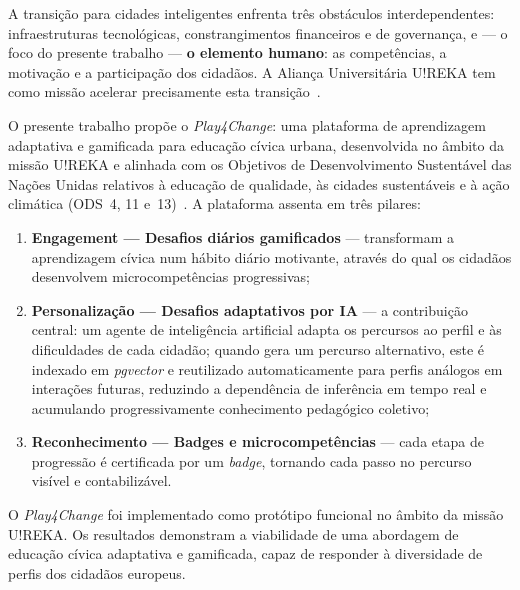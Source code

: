 \abstractPT  %

A transição para cidades inteligentes enfrenta três obstáculos interdependentes:
infraestruturas tecnológicas, constrangimentos financeiros e de governança, e --- o foco do
presente trabalho --- \textbf{o elemento humano}: as competências, a motivação e a
participação dos cidadãos. A Aliança Universitária U!REKA tem como missão acelerar
precisamente esta transição~\cite{ureka2024}.

O presente trabalho propõe o \textit{Play4Change}: uma plataforma de aprendizagem adaptativa
e gamificada para educação cívica urbana, desenvolvida no âmbito da missão U!REKA e alinhada
com os Objetivos de Desenvolvimento Sustentável das Nações Unidas relativos à educação de
qualidade, às cidades sustentáveis e à ação climática (ODS~4, 11 e~13)~\cite{un2015sdg}.
A plataforma assenta em três pilares:

\begin{enumerate}
  \item \textbf{Engagement --- Desafios diários gamificados} --- transformam a aprendizagem
        cívica num hábito diário motivante, através do qual os cidadãos desenvolvem
        microcompetências progressivas;

  \item \textbf{Personalização --- Desafios adaptativos por IA} --- a contribuição central:
        um agente de inteligência artificial adapta os percursos ao perfil e às dificuldades
        de cada cidadão; quando gera um percurso alternativo, este é indexado em
        \textit{pgvector} e reutilizado automaticamente para perfis análogos em interações
        futuras, reduzindo a dependência de inferência em tempo real e acumulando
        progressivamente conhecimento pedagógico coletivo;

  \item \textbf{Reconhecimento --- Badges e microcompetências} --- cada etapa de progressão
        é certificada por um \textit{badge}, tornando cada passo no percurso visível e
        contabilizável.
\end{enumerate}

O \textit{Play4Change} foi implementado como protótipo funcional no âmbito da missão U!REKA.
Os resultados demonstram a viabilidade de uma abordagem de educação cívica adaptativa e
gamificada, capaz de responder à diversidade de perfis dos cidadãos europeus.
